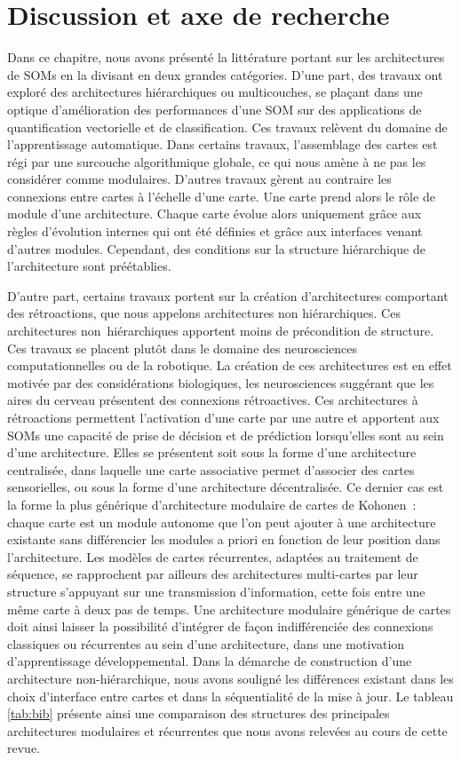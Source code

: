 \documentclass[../main]{subfiles}
\begin{document}
\section{Discussion et axe de recherche}

Dans ce chapitre, nous avons présenté la littérature portant sur les architectures de SOMs en la divisant en deux grandes catégories. 
D'une part, des travaux ont exploré des architectures hiérarchiques ou multicouches, se plaçant dans une optique d'amélioration des performances d'une SOM sur des applications de quantification vectorielle et de classification. Ces travaux relèvent du domaine de l'apprentissage automatique. 
Dans certains travaux, l'assemblage des cartes est régi par une surcouche algorithmique globale, ce qui nous amène à ne pas les considérer comme modulaires. 
D'autres travaux gèrent au contraire les connexions entre cartes à l'échelle d'une carte. Une carte prend alors le rôle de module d'une architecture. Chaque carte évolue alors uniquement grâce aux règles d'évolution internes qui ont été définies et grâce aux interfaces venant d'autres modules. Cependant, des conditions sur la structure hiérarchique de l'architecture sont préétablies.

D'autre part, certains travaux portent sur la création d'architectures comportant des rétroactions, que nous appelons architectures non hiérarchiques. Ces architectures non~hiérarchiques apportent moins de précondition de structure.
Ces travaux se placent plutôt dans le domaine des neurosciences computationnelles ou de la robotique. La création de ces architectures est en effet motivée par des considérations biologiques, les neurosciences suggérant que les aires du cerveau présentent des connexions rétroactives. 
Ces architectures à rétroactions permettent l'activation d'une carte par une autre et apportent aux SOMs une capacité de prise de décision et de prédiction lorsqu'elles sont au sein d'une architecture. 
Elles se présentent soit sous la forme d'une architecture centralisée, dans laquelle une carte associative permet d'associer des cartes sensorielles, ou sous la forme d'une architecture décentralisée. 
Ce dernier cas est la forme la plus générique d'architecture modulaire de cartes de Kohonen~: chaque carte est un module autonome que l'on peut ajouter à une architecture existante sans différencier les modules a priori en fonction de leur position dans l'architecture.
Les modèles de cartes récurrentes, adaptées au traitement de séquence, se rapprochent par ailleurs des architectures multi-cartes par leur structure s'appuyant sur une transmission d'information, cette fois entre une même carte à deux pas de temps. 
Une architecture modulaire générique de cartes doit ainsi laisser la possibilité d'intégrer de façon indifférenciée des connexions classiques ou récurrentes au sein d'une architecture, dans une motivation d'apprentissage développemental.
Dans la démarche de construction d'une architecture non-hiérarchique, nous avons souligné les différences existant dans les choix d'interface entre cartes et dans la séquentialité de la mise à jour.
Le tableau \ref{tab:bib} présente ainsi une comparaison des structures des principales architectures modulaires et récurrentes que nous avons relevées au cours de cette revue.
\end{document}
